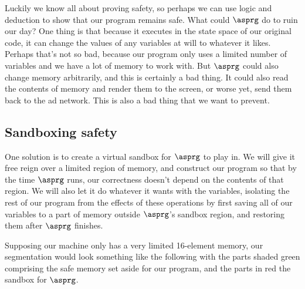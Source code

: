 \documentclass[11pt,twoside]{scrartcl}
\begin{document}
Luckily we know all about proving safety, so perhaps we can use logic and deduction to show that our program remains safe. What could $\asprg$ do to ruin our day? One thing is that because it executes in the state space of our original code, it can change the values of any variables at will to whatever it likes. Perhaps that's not so bad, because our program only uses a limited number of variables and we have a lot of memory to work with. But $\asprg$ could also change memory arbitrarily, and this is certainly a bad thing. It could also read the contents of memory and render them to the screen, or worse yet, send them back to the ad network. This is also a bad thing that we want to prevent.

\subsection{Sandboxing safety}
One solution is to create a virtual sandbox for $\asprg$ to play in. We will give it free reign over a limited region of memory, and construct our program so that by the time $\asprg$ runs, our correctness doesn't depend on the contents of that region. We will also let it do whatever it wants with the variables, isolating the rest of our program from the effects of these operations by first saving all of our variables to a part of memory outside $\asprg$'s sandbox region, and restoring them after $\asprg$ finishes.

Supposing our machine only has a very limited 16-element memory, our segmentation would look something like the following with the parts shaded green comprising the safe memory set aside for our program, and the parts in red the sandbox for $\asprg$.
\end{document}
